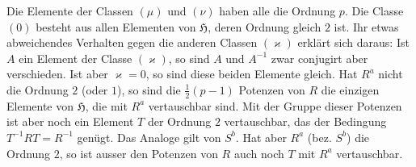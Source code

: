 \documentclass[11pt]{article}
\newcommand{\grp}{\mathfrak{H}}
\begin{document}
Die Elemente der Classen $(\mu)$ und $(\nu)$ haben alle die Ordnung $p$. Die Classe $(0)$ besteht aus allen Elementen von $\grp$, deren Ordnung gleich $2$ ist. Ihr etwas abweichendes Verhalten gegen die anderen Classen $(\varkappa)$ erklärt sich daraus: Ist $A$ ein Element der Classe $(\varkappa)$, so sind $A$ und $A^{-1}$ zwar conjugirt aber verschieden. Ist aber $\varkappa=0$, so sind diese beiden Elemente gleich. Hat $R^a$ nicht die Ordnung $2$ (oder $1$), so sind die $\frac12(p-1)$ Potenzen von $R$ die einzigen Elemente von $\grp$, die mit $R^a$ vertauschbar sind. Mit der Gruppe dieser Potenzen ist aber noch ein Element $T$ der Ordnung $2$ vertauschbar, das der Bedingung $T^{-1}RT=R^{-1}$ genügt. Das Analoge gilt von $S^b$. Hat aber $R^a$ (bez. $S^b$) die Ordnung $2$, so ist ausser den Potenzen von $R$ auch noch $T$ mit $R^a$ vertauschbar.
\end{document}
